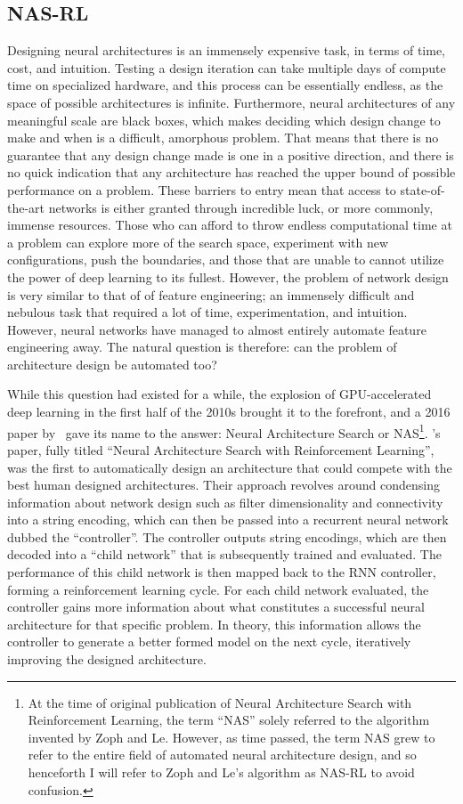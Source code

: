 \subsection{NAS-RL}
Designing neural architectures is an immensely expensive task, in terms of time, cost, and intuition. Testing a design iteration
can take multiple days of compute time on specialized hardware, and this process can be essentially endless, as the space
of possible architectures is infinite. Furthermore, neural architectures of any meaningful scale are black boxes, which makes
deciding which design change to make and when is a difficult, amorphous problem. That means that there is no guarantee that any
design change made is one in a positive direction, and there is no quick indication that any architecture has reached
the upper bound of possible performance on a problem. These barriers to entry mean that access to state-of-the-art networks
is either granted through incredible luck, or more commonly, immense resources. Those who can afford to throw endless computational
time at a problem can explore more of the search space, experiment with new configurations, push the boundaries, and those that
are unable to cannot utilize the power of deep learning to its fullest. However, the problem of network design is very similar to that of
of feature engineering; an immensely difficult and nebulous task that required a lot of time, experimentation, and intuition.
However, neural networks have managed to almost entirely automate feature engineering away.
The natural question is therefore: can the problem of architecture design be automated too?

While this question had existed for a while, the explosion of GPU-accelerated deep learning in the first half of the 2010s brought
it to the forefront, and a 2016 paper by~\citeauthor{zoph2017} gave its name to the answer:
Neural Architecture Search or NAS\footnote{At the time of original publication of Neural Architecture Search with
Reinforcement Learning, the term ``NAS'' solely referred to the algorithm invented by Zoph and Le. However, as time passed, the term NAS
grew to refer to the entire field of automated neural architecture design, and so henceforth I will refer to Zoph and Le's
algorithm as NAS-RL to avoid confusion.}. \citeauthor{zoph2017}'s paper, fully titled ``Neural Architecture Search with Reinforcement Learning'',
was the first to automatically design an architecture that could compete with the best human designed architectures. Their approach
revolves around condensing information about network design such as filter dimensionality and connectivity into a string
encoding, which can then be passed into a recurrent neural network dubbed the ``controller''. The controller outputs
string encodings, which are then decoded into a ``child network'' that is subsequently trained and evaluated. The performance of this
child network is then mapped back to the RNN controller, forming a reinforcement learning cycle. For each child network evaluated,
the controller gains more information about what constitutes a successful neural architecture for that specific problem. In theory,
this information allows the controller to generate a better formed model on the next cycle, iteratively improving the designed
architecture.

